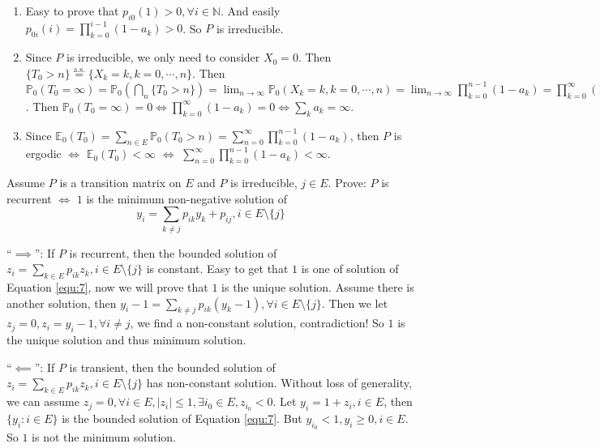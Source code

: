 \documentclass{ctexart}
\begin{document}
\begin{solution}
  \begin{enumerate}
    \item Easy to prove that \(p_{i0}(1)>0,\forall i \in \mathbb{N}\).
      And easily \(p_{0i}(i)=\prod_{k=0}^{i-1} (1-a_k)>0\).
      So \(P\) is irreducible.
    \item Since \(P\) is irreducible, we only need to consider \(X_0=0\). Then \(\{T_0 > n\} \overset{\text{a.s.}}{=}\{X_k=k,k=0,\cdots,n\}\).
      Then \(\mathbb{P}_0(T_0 = \infty)=\mathbb{P}_0(\bigcap_{n}\{T_0 > n\})=\lim_{n \to \infty}\mathbb{P}_0(X_k=k,k=0,\cdots,n)=\lim_{n \to \infty}\prod_{k=0}^{n-1} (1-a_k) =\prod_{k=0}^{\infty} (1-a_k) \).
      Then \(\mathbb{P}_0(T_0=\infty)=0 \iff \prod_{k=0}^{\infty} (1-a_k) =0\iff \sum_{k}a_k=\infty\).
    \item Since \(\mathbb{E}_0(T_0)=\sum_{n \in E}\mathbb{P}_0(T_0 >n)=\sum_{n=0}^{\infty} \prod_{k=0}^{n-1} (1-a_k)\), then \(P\) is ergodic
      \(\iff \) \(\mathbb{E}_0(T_0) < \infty\) \(\iff\) \(\sum_{n=0}^{\infty} \prod_{k=0}^{n-1} (1-a_k) <\infty\).
  \end{enumerate}
\end{solution}
\begin{problem}\label{pro:7}
  Assume \(P\) is a transition matrix on \(E\) and \(P\) is irreducible, \(j \in E\).
  Prove: \(P\) is recurrent \(\iff\) \(1\) is the minimum non-negative solution of
  \begin{equation}\label{equ:7}
    y_i = \sum_{k \neq j} p_{ik}y_k + p_{ij}, i \in E\setminus\{j\}
  \end{equation}
\end{problem}
\begin{solution}
  ``\(\implies\)'': If \(P\) is recurrent, then the bounded solution of \(z_i=\sum_{k \in E}p_{ik}z_k, i  \in E\setminus\{j\}\) is constant.
  Easy to get that \(1\) is one of solution of Equation \eqref{equ:7}, now we will prove that \(1\) is the unique solution.
  Assume there is another solution, then \(y_i-1=\sum_{k \neq j}p_{ik}(y_k-1),\forall i \in E\setminus\{j\}\).
  Then we let \(z_j=0,z_i=y_i-1,\forall i \neq j\), we find a non-constant solution, contradiction!
  So \(1\) is the unique solution and thus minimum solution.

  ``\(\impliedby\)'': If \(P\) is transient, then the bounded solution of \(z_i=\sum_{k \in E}p_{ik}z_k, i  \in E\setminus\{j\}\) has non-constant solution.
  Without loss of generality, we can assume \(z_j=0,\forall i \in E,|z_i| \leq 1,  \exists i_0 \in E, z_{i_0} <0\).
  Let \(y_i = 1 + z_i, i \in E\), then \(\{y_i: i \in E\}\) is the bounded solution of Equation \eqref{equ:7}.
  But \(y_{i_0} <1, y_i \geq 0, i \in E\).
  So \(1\) is not the minimum solution.
\end{solution}
\end{document}
